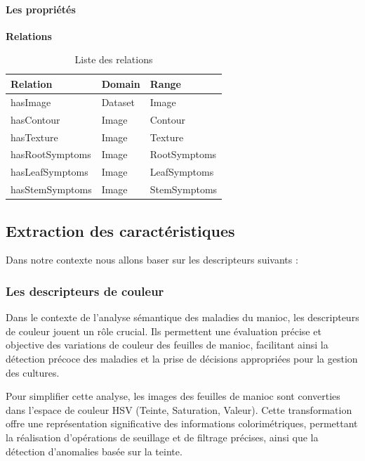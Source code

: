 \documentclass{article}
\begin{document}
	\FloatBarrier
	
	\paragraph{Les propriétés}
	\noindent\textbf{Relations}
	\begin{table}[H]
		\centering
		\begin{tabular}{|p{5cm}|p{5cm}|p{5cm}|}
			\hline
			\textbf{Relation} & \textbf{Domain} & \textbf{Range} \\
			\hline
			hasImage & Dataset & Image \\
			\hline
			hasContour & Image & Contour \\
			\hline
			hasTexture & Image & Texture \\
			\hline
			hasRootSymptoms & Image & RootSymptoms \\
			\hline
			hasLeafSymptoms & Image & LeafSymptoms \\
			\hline
			hasStemSymptoms & Image & StemSymptoms \\
			\hline
		\end{tabular}
		\caption{Liste des relations}
	\end{table}
	
	\FloatBarrier

	\subsection{Extraction des caractéristiques}
	Dans notre contexte nous allons baser sur les descripteurs suivants :
	
	\subsubsection{Les descripteurs de couleur}
	Dans le contexte de l'analyse sémantique des maladies du manioc, les descripteurs de couleur jouent un rôle crucial. Ils permettent une évaluation précise et objective des variations de couleur des feuilles de manioc, facilitant ainsi la détection précoce des maladies et la prise de décisions appropriées pour la gestion des cultures.
	
	Pour simplifier cette analyse, les images des feuilles de manioc sont converties dans l'espace de couleur HSV (Teinte, Saturation, Valeur). Cette transformation offre une représentation significative des informations colorimétriques, permettant la réalisation d'opérations de seuillage et de filtrage précises, ainsi que la détection d'anomalies basée sur la teinte.
	
\end{document}
